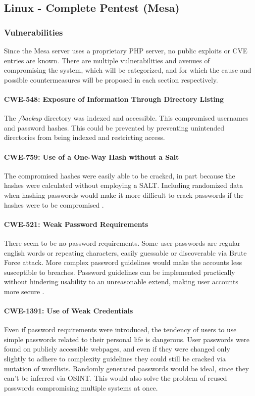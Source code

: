 \documentclass[../report.tex]{subfiles}
\begin{document}
\subsection{Linux - Complete Pentest (Mesa)}

\subsubsection{Vulnerabilities}
Since the Mesa server uses a proprietary PHP server, no public exploits or CVE entries are known.
There are multiple vulnerabilities and avenues of compromising the system, which will be categorized, and for which the cause and possible countermeasures will be proposed in each section respectively.

\paragraph{CWE-548: Exposure of Information Through Directory Listing}
The \textit{/backup} directory was indexed and accessible. This compromised usernames and password hashes. This could be prevented by preventing unintended directories from being indexed and restricting access.

\paragraph{CWE-759: Use of a One-Way Hash without a Salt}
The compromised hashes were easily able to be cracked, in part because the hashes were calculated without employing a SALT. Including randomized data when hashing passwords would make it more difficult to crack passwords if the hashes were to be compromised \autocite{10331606}.

\paragraph{CWE-521: Weak Password Requirements}
There seem to be no password requirements. Some user passwords are regular english words or repeating characters, easily guessable or discoverable via Brute Force attack. More complex password guidelines would make the accounts less susceptible to breaches. Password guidelines can be implemented practically without hindering usability to an unreasonable extend, making user accounts more secure \autocite{10.1145/2891411}.

\paragraph{CWE-1391: Use of Weak Credentials }
Even if password requirements were introduced, the tendency of users to use simple passwords related to their personal life is dangerous. User passwords were found on publicly accessible webpages, and even if they were changed only slightly to adhere to complexity guidelines they could still be cracked via mutation of wordlists. Randomly generated passwords would be ideal, since they can't be inferred via OSINT. This would also solve the problem of reused passwords compromising multiple systems at once.
\end{document}
